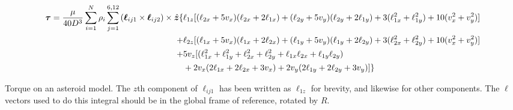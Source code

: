 \documentclass[aps,twocolumn,secnumarabic,balancelastpage,amsmath,amssymb,nofootinbib,floatfix]{revtex4-1}
\begin{document}
\begin{table*} 
    \begin{equation}
        \begin{aligned}
        \bm \tau = \frac{\mu}{40D^3}\sum_{i=1}^N\rho_i \sum_{j=1}^{6, 12} \left( \bm\ell_{ij1} \times \bm\ell_{ij2} \right) \times \hat {\bm z} \{
        &\ell_{1z} [(\ell_{2x} + 5v_x)(\ell_{2x} + 2\ell_{1x}) + (\ell_{2y} + 5 v_y)(\ell_{2y}+2\ell_{1y}) + 3 (\ell_{1x}^2 + \ell_{1y}^2) + 10(v_x^2 + v_y^2)]\\
        + &\ell_{2z} [ (\ell_{1x}+5v_x)(\ell_{1x}+2\ell_{2x}) + (\ell_{1y}+5v_y)(\ell_{1y}+2\ell_{2y}) + 3 (\ell_{2x}^2 + \ell_{2y}^2) + 10(v_x^2 + v_y^2)]\\
        + &5v_z [(\ell_{1x}^2 + \ell_{1y}^2 + \ell_{2x}^2 + \ell_{2y}^2 + \ell_{1x} \ell_{2x} + \ell_{1y} \ell_{2y}) \\
        & + 2v_x(2\ell_{1x} + 2\ell_{2x} + 3 v_x) + 2v_y(2\ell_{1y} + 2\ell_{2y} + 3 v_y)]\}
        \end{aligned}
    \label{eqn:analytical-torque}
    \end{equation}
    \caption*{Torque on an asteroid model. The $z$th component of $\bm \ell_{ij1}$ has been written as $\ell_{1z}$ for brevity, and likewise for other components. The $\bm \ell$ vectors used to do this integral should be in the global frame of reference, rotated by $R$.}
\end{table*}




\end{document}
